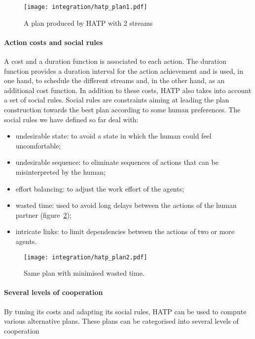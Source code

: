 \begin{figure}[htbp]
  \centering
  \texttt{[image: integration/hatp\_plan1.pdf]}
  \caption{A plan produced by HATP with 2 streams}
  \label{plan_hatp1}
\end{figure}

\paragraph{Action costs and social rules} A cost and a duration function is
associated to each action.  The duration function provides a duration interval
for the action achievement and is used, in one hand, to schedule the different
streams and, in the other hand, as an additional cost function.  In addition to
these costs, HATP also takes into account a set of social rules.  Social rules
are constraints aiming at leading the plan construction towards the best plan
according to some human preferences. The social rules we have defined so far
deal with:

\begin{itemize}

    \item undesirable state: to avoid a state in which the human could feel
    uncomfortable;

    \item undesirable sequence: to eliminate sequences of actions that can be
    misinterpreted by the human;

    \item effort balancing: to adjust the work effort of the agents;

    \item wasted time: used to avoid long delays between the actions of the
    human partner (figure~\ref{plan_hatp2});

    \item intricate links: to limit dependencies between the actions of two or
    more agents.

\end{itemize}

\begin{figure}[htbp]
  \centering
  \texttt{[image: integration/hatp\_plan2.pdf]}
  \caption{Same plan with minimised wasted time.}
  \label{plan_hatp2}
\end{figure}

\paragraph{Several levels of cooperation} By tuning its costs and adapting its
social rules, HATP can be used to compute various alternative plans. These
plans can be categorised into several levels of cooperation

